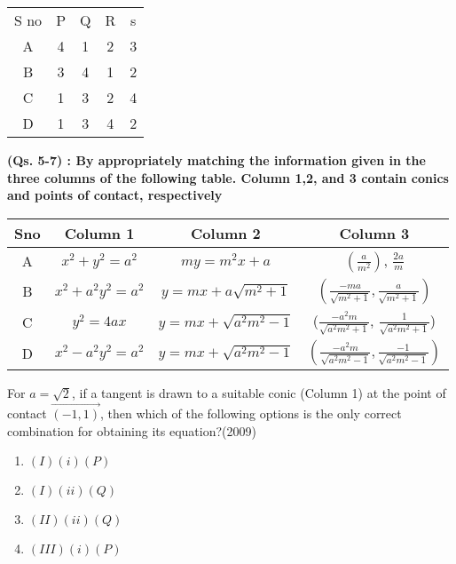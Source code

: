 \begin{table}[h!]
\centering
\begin{tabular}{|c|c|c|c|c|}
\hline
S no & P & Q & R & s \\
A &4 & 1 & 2 & 3 \\
B & 3 & 4 & 1 & 2 \\
C & 1 & 3& 2 & 4 \\
D & 1 & 3 & 4 & 2 \\
\hline
\end{tabular}

\end{table}

\textbf{(Qs. 5-7) : By appropriately matching the information given in the three columns of the following table. Column 1,2, and 3 contain conics and points of contact, respectively}

\begin{table}[h!]
\centering
\begin{tabular}{|c|c|c|c|}
\hline
Sno & Column 1       & Column 2 & Column 3 \\
\hline
A & $x^2 + y^2 = a^2$ & $my = m^2x + a$ & $(\frac{a}{m^2})$, $\frac{2a}{m}$ \\
B & $x^2 + a^2y^2 = a^2  $      & $y = mx +a\sqrt{m^2 + 1}$  & $(\frac{-ma}{\sqrt{m^2 + 1}},\frac{a}{\sqrt{m^2 + 1}})   $   \\
C & $y^2=4ax $  & $y = mx + \sqrt{a^2m^2 - 1}$ & ($\frac{-a^2m}{\sqrt{a^2m^2 + 1}}$, $\frac{1}{\sqrt{a^2m^2 + 1}}$)    \\
D & $x^2 - a^2y^2 = a^2$     & $y = mx + \sqrt{a^2m^2 - 1 }$  & $(\frac{-a^2m}{\sqrt{a^2m^2 - 1}}, \frac{-1}{\sqrt{a^2m^2 - 1}})$      \\

\hline
\end{tabular}

\end{table}

\item For $a =\sqrt{2}$, if a tangent is drawn to a suitable conic (Column 1) at the point of contact $\vec{(-1, 1)}$, then which of the following
options is the only correct combination for obtaining its equation?\hfill{(2009)}

\begin{enumerate}[label=(\alph*)]
    \item $(I)(i)(P)$
    \item $(I)(ii)(Q)$
    \item $(II)(ii)(Q)$
    \item $(III)(i)(P)$
\end{enumerate}

